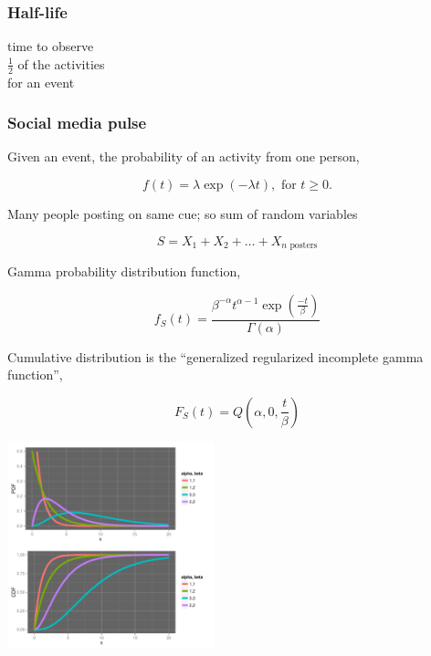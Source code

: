 \documentclass{beamer}
\begin{document}
\begin{frame}\frametitle{Half-life}
\begin{center}
{\Huge time to observe \\[6pt] $\frac{1}{2}$ of the activities \\[6pt] for an event}
\end{center}
\end{frame}

\begin{frame}
\frametitle{Social media pulse} 
Given an event, the probability of an activity from one person,

\begin{equation*}
f(t) = \lambda \exp(-\lambda t), \text{ for } t \geq 0.
\end{equation*}

Many people posting on same cue; so sum of random variables 

\begin{equation*}
S = X_1 + X_2 + \ldots + X_{n \text{ posters}}
\end{equation*}

Gamma probability distribution function,

\begin{equation*}
f_S(t) = \frac{ \beta^{-\alpha} t^{\alpha-1} \exp( \frac{-t}{\beta}) } {\Gamma(\alpha)}
\end{equation*}

Cumulative distribution is the ``generalized regularized incomplete gamma function'',

\begin{equation*}
F_S(t) = Q(\alpha, 0, \frac{ t}{\beta})
\end{equation*}
\end{frame}


\begin{frame}
  \begin{center}
   \includegraphics[height=6cm]{./imgs/SMP_gammadist.pdf}
  \end{center}
\end{frame}
\end{document}
